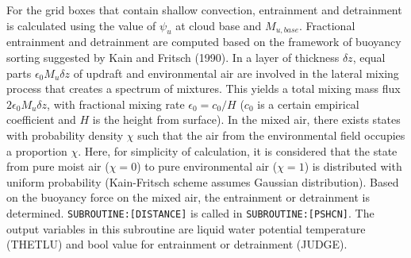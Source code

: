 For the grid boxes that contain shallow convection, entrainment and detrainment is calculated using the value of $\psi_u$ at cloud base and $M_{u,base}$.
Fractional entrainment and detrainment are computed based on the framework of buoyancy sorting suggested by Kain and Fritsch (1990).
In a layer of thickness $\delta z$, equal parts $\epsilon_0 M_u \delta z$ of updraft and environmental air are involved in the lateral mixing process that creates a spectrum of mixtures.
This yields a total mixing mass flux $2\epsilon_0 M_u \delta z$, with fractional mixing rate $\epsilon_0=c_0/H$ ($c_0$ is a certain empirical coefficient and $H$ is the height from surface).
In the mixed air, there exists states with probability density $\chi$ such that the air from the environmental field occupies a proportion $\chi$. Here, for simplicity of calculation, 
it is considered that the state from pure moist air ($\chi=0$) to pure environmental air ($\chi=1$) is distributed with uniform probability (Kain-Fritsch scheme assumes Gaussian distribution).
Based on the buoyancy force on the mixed air, the entrainment or detrainment is determined. \texttt{SUBROUTINE:[DISTANCE]} is called in \texttt{SUBROUTINE:[PSHCN]}.
The output variables in this subroutine are liquid water potential temperature (THETLU) and bool value for entrainment or detrainment (JUDGE).

